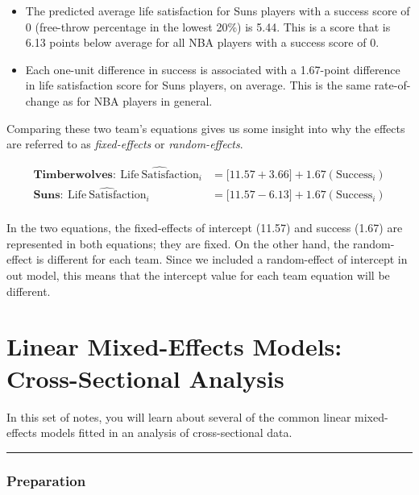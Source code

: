 \documentclass[]{book}
\providecommand{\tightlist}{%
  \setlength{\itemsep}{0pt}\setlength{\parskip}{0pt}}
\begin{document}
\begin{itemize}
\tightlist
\item
  The predicted average life satisfaction for Suns players with a success score of 0 (free-throw percentage in the lowest 20\%) is 5.44. This is a score that is 6.13 points below average for all NBA players with a success score of 0.
\item
  Each one-unit difference in success is associated with a 1.67-point difference in life satisfaction score for Suns players, on average. This is the same rate-of-change as for NBA players in general.
\end{itemize}

Comparing these two team's equations gives us some insight into why the effects are referred to as \emph{fixed-effects} or \emph{random-effects}.

\[
\begin{split}
\mathbf{Timberwolves:~}\hat{\mathrm{Life~Satisfaction}}_{i} &= \bigg[11.57 + 3.66 \bigg] + 1.67(\mathrm{Success}_{i}) \\[1ex]
\mathbf{Suns:~}\hat{\mathrm{Life~Satisfaction}}_{i} &= \bigg[11.57 - 6.13 \bigg] + 1.67(\mathrm{Success}_{i}) \\[1ex]
\end{split}
\]

In the two equations, the fixed-effects of intercept (11.57) and success (1.67) are represented in both equations; they are fixed. On the other hand, the random-effect is different for each team. Since we included a random-effect of intercept in out model, this means that the intercept value for each team equation will be different.

\hypertarget{lmer-cross-sectional}{%
\chapter{Linear Mixed-Effects Models: Cross-Sectional Analysis}\label{lmer-cross-sectional}}

In this set of notes, you will learn about several of the common linear mixed-effects models fitted in an analysis of cross-sectional data.

\begin{center}\rule{0.5\linewidth}{\linethickness}\end{center}

\hypertarget{preparation-8}{%
\subsection*{Preparation}\label{preparation-8}}
\end{document}
